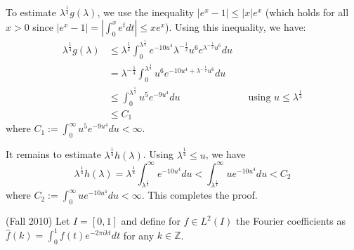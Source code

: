 \documentclass[answers]{exam}
\theoremstyle{problemstyle}
\newcommand{\1}[1]{\textbf{1}_{\left[#1\right]}} %
\def\Z{\mathbb{Z}} %
\begin{document}
\begin{questions}
\begin{solution}
  To estimate $\lambda^{\frac{1}{4}}g(\lambda)$, we use the inequality $|e^{x}-1|\leq |x|e^{x}$  (which holds for all $x>0$ since $|e^{x}-1|=|\int_{0}^{x}e^{t}dt|\leq xe^{x}$). Using this inequality, we have:
   \begin{align*}
     \lambda^{\frac{1}{4}}g(\lambda)
     &\leq \lambda^{\frac{1}{4}}\int_{0}^{\lambda^{\frac{1}{4}}} e^{-10u^{4}}\lambda^{-\frac{1}{2}}u^{6}e^{\lambda^{-\frac{1}{2}}u^{6}}du\\
     &=\lambda^{-\frac{1}{4}}\int_{0}^{\lambda^{\frac{1}{4}}} u^{6}e^{-10u^{4}+\lambda^{-\frac{1}{2}}u^{6}}du\\
     &\leq \int_{0}^{\lambda^{\frac{1}{4}}} u^{5}e^{-9u^{4}}du &&\text{using }u\leq \lambda^{\frac{1}{4}}\\
     &\leq  C_{1}
   \end{align*}
   where $C_{1} := \int_{0}^{\infty} u^{5}e^{-9u^{4}}du<\infty$.
   
   It remains to estimate $\lambda^{\frac{1}{4}}h(\lambda)$. Using $\lambda^{\frac{1}{4}}\leq u$, we have
   \begin{equation*}
     \lambda^{\frac{1}{4}}h(\lambda)
      = \lambda^{\frac{1}{4}}\int_{\lambda^{\frac{1}{4}}}^{\infty}e^{-10u^{4}}du
     < \int_{\lambda^{\frac{1}{4}}}^{\infty}ue^{-10 u^{4}}du < C_{2}
   \end{equation*}
   where $C_{2} := \int_{0}^{\infty}ue^{-10u^{4}}du<\infty$. This completes the proof.
 \end{solution}

\question (Fall 2010)
Let $I = [0,1]$ and define for $f\in L^{2}(I)$ the Fourier coefficients as $\hat{f}(k) =\int_{0}^{1}f(t)e^{-2\pi i k t}dt$ for any $k\in \Z$. 


\end{questions}
\end{document}
